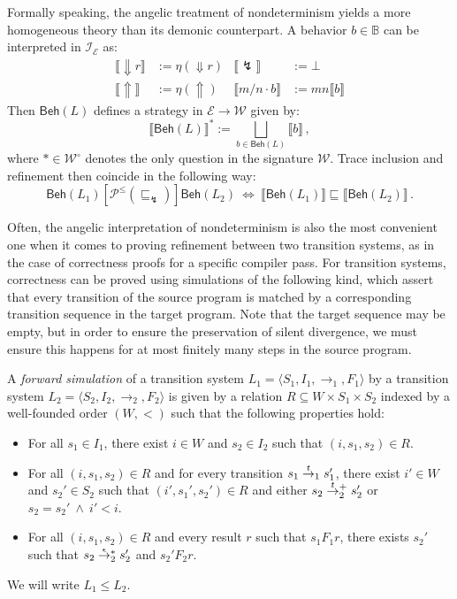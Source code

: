 \documentclass[sigplan,10pt,review,anonymous]{acmart}
\newcommand{\kw}[1]{\ensuremath{\mathsf{#1}}}
\newcommand{\refby}{\sqsubseteq}
\newcommand{\que}{{\circ}}
\newcommand{\ifr}[1]{\mathrel{[{#1}]}}
\begin{document}
Formally speaking,
the angelic treatment of nondeterminism
yields a more homogeneous theory
than its demonic counterpart.
A behavior $b \in \mathbb{B}$ can be interpreted
in $\mathcal{I}_\mathcal{E}$ as:
\begin{align*}
  \llbracket {\Downarrow}r \rrbracket &:= \eta({\Downarrow} r) &
  \llbracket {\lightning} \rrbracket &:= \bot \\
  \llbracket {\Uparrow} \rrbracket &:= \eta({\Uparrow}) &
  \llbracket m / n \cdot b \rrbracket &:=
    m n \llbracket b \rrbracket
\end{align*}
Then $\kw{Beh}(L)$ defines a strategy
in $\mathcal{E} \rightarrow \mathcal{W}$ given by:
\[
  \llbracket \kw{Beh}(L) \rrbracket^* :=
    \bigsqcup_{b \in \kw{Beh}(L)} \llbracket b \rrbracket
  \,,
\]
where $* \in \mathcal{W}^\que$ denotes the only question
in the signature $\mathcal{W}$.
Trace inclusion and refinement then
coincide in the following way:
\[
  \kw{Beh}(L_1)
  \ifr{\mathcal{P}^\le({\refby_\lightning})}
  \kw{Beh}(L_2)
  \: \Leftrightarrow \:
  \llbracket \kw{Beh}(L_1) \rrbracket
  \refby
  \llbracket \kw{Beh}(L_2) \rrbracket
  \,.
\]

Often,
the angelic interpretation of nondeterminism
is also the most convenient one
when it comes to proving refinement between
two transition systems,
as in the case of correctness proofs for
a specific compiler pass.
For transition systems,
correctness can be proved using simulations of the following kind,
which assert that every transition of the source program
is matched by a corresponding transition sequence in the target program.
Note that the target sequence may be empty,
but in order to ensure the preservation of silent divergence,
we must ensure this happens for at most
finitely many steps in the source program.

\begin{definition}
A \emph{forward simulation}
of a transition system
$L_1 = \langle S_1, I_1, {\rightarrow}_1, F_1 \rangle$
by a transition system
$L_2 = \langle S_2, I_2, {\rightarrow}_2, F_2 \rangle$
is given by a relation $R \subseteq W \times S_1 \times S_2$
indexed by a well-founded order $(W, {<})$
such that the following properties hold:
\begin{itemize}
  \item For all $s_1 \in I_1$,
    there exist $i \in W$ and $s_2 \in I_2$
    such that $(i, s_1, s_2) \in R$.
  \item For all $(i, s_1, s_2) \in R$
    and for every transition
    $s_1 \mathrel{\smash{\stackrel{t}{\rightarrow}}_1} s_1'$,
    there exist $i' \in W$ and $s_2' \in S_2$
    such that $(i', s_1', s_2') \in R$ and either
    $s_2 \mathrel{\smash{\stackrel{t}{\rightarrow}}_2^+} s_2'$ or
    $s_2 = s_2' \:\wedge\: i' < i$.
  \item For all $(i, s_1, s_2) \in R$
    and every result $r$ such that $s_1 \mathrel{F_1} r$,
    there exists $s_2'$ such that
    $s_2 \mathrel{\smash{\stackrel{\epsilon}{\rightarrow}}_2^*} s_2'$ and
    $s_2' \mathrel{F_2} r$.
\end{itemize}
We will write $L_1 \le L_2$.
\end{definition}
\end{document}
